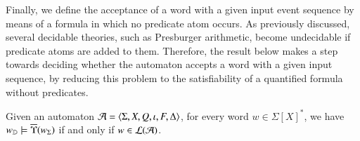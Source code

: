 \documentclass{llncs}
\begin{document}

Finally, we define the acceptance of a word with a given input event
sequence by means of a formula in which no predicate atom occurs. As
previously discussed, several decidable theories, such as Presburger
arithmetic, become undecidable if predicate atoms are added to
them. Therefore, the result below makes a step towards deciding
whether the automaton accepts a word with a given input sequence, by
reducing this problem to the satisfiability of a quantified formula
without predicates. 

\begin{lemma}\label{lemma:quant-pred-acceptance}
  Given an automaton $\mathcal{A} = \langle \Sigma,X,Q,\iota,F,\Delta \rangle$, for
  every word $w \in \Sigma[X]^*$, we have ${w}_{\mathbb{D}} \models
  \overline{\Upsilon}({{w}_\Sigma})$ if and only if $w \in {\mathcal L}({\mathcal{A}})$.
\end{lemma}
\end{document}
